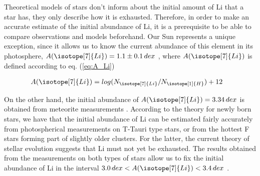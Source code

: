 \documentclass[fleqn,usenatbib]{mnras}
\begin{document}
Theoretical models of stars don't inform about the initial amount of Li that a star has, they only describe how it is exhausted. Therefore, in order to make an accurate estimate of the initial abundance of Li, it is a prerequisite to be able to compare observations and models beforehand. Our Sun represents a unique exception, since it allows us to know the current abundance of this element in its photosphere, $A(\isotope[7]{Li}) = 1.1 \pm 0.1 \, dex$ \citep{Jeffries2004}, where $A(\isotope[7]{Li})$ is defined according to eq. (\ref{eq:A_Li})\par


\begin{ceqn}
\begin{align}
    A(\isotope[7]{Li}) &= log(N_{\isotope[7]{Li}} / N_{\isotope[1]{H}}) + 12
    \label{eq:A_Li}
\end{align}
\end{ceqn}

On the other hand, the initial abundance of $A(\isotope[7]{Li}) = 3.34 \, dex$ is obtained from meteorite measurements \citet{Randich2006}. According to the theory for newly born stars, we have that the initial abundance of Li can be estimated fairly accurately from photospherical measurements on T-Tauri type stars, or from the hottest F stars forming part of slightly older clusters. For the latter, the current theory of stellar evolution suggests that Li must not yet be exhausted. The results obtained from the measurements on both types of stars allow us to fix the initial abundance of Li in the interval $3.0 \, dex < A(\isotope[7]{Li}) < 3.4 \, dex$ \citet{Randich2006}.\par
\end{document}
